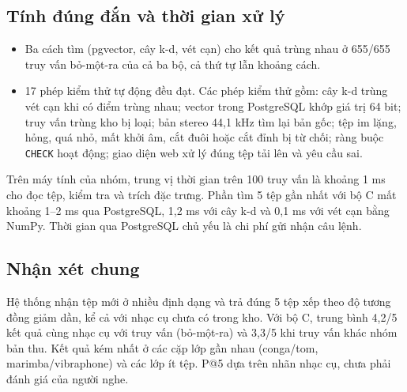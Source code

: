 \documentclass[11pt,a4paper]{article}
\begin{document}
\subsection{Tính đúng đắn và thời gian xử lý}\label{sec:dungdan}
\begin{itemize}
\item Ba cách tìm (pgvector, cây k-d, vét cạn) cho kết quả trùng nhau ở 655/655 truy vấn bỏ-một-ra của cả ba bộ, cả thứ tự lẫn khoảng cách.
\item 17 phép kiểm thử tự động đều đạt. Các phép kiểm thử gồm: cây k-d trùng vét cạn khi có điểm trùng nhau; vector trong PostgreSQL khớp giá trị 64 bit; truy vấn trùng kho bị loại; bản stereo 44,1 kHz tìm lại bản gốc; tệp im lặng, hỏng, quá nhỏ, mất khởi âm, cắt đuôi hoặc cắt đỉnh bị từ chối; ràng buộc \texttt{CHECK} hoạt động; giao diện web xử lý đúng tệp tải lên và yêu cầu sai.
\end{itemize}
Trên máy tính của nhóm, trung vị thời gian trên 100 truy vấn là khoảng 1 ms cho đọc tệp, kiểm tra và trích đặc trưng. Phần tìm 5 tệp gần nhất với bộ C mất khoảng 1--2 ms qua PostgreSQL, 1,2 ms với cây k-d và 0,1 ms với vét cạn bằng NumPy. Thời gian qua PostgreSQL chủ yếu là chi phí gửi nhận câu lệnh.

\subsection{Nhận xét chung}
\enlargethispage{2\baselineskip}
Hệ thống nhận tệp mới ở nhiều định dạng và trả đúng 5 tệp xếp theo độ tương đồng giảm dần, kể cả với nhạc cụ chưa có trong kho. Với bộ C, trung bình 4,2/5 kết quả cùng nhạc cụ với truy vấn (bỏ-một-ra) và 3,3/5 khi truy vấn khác nhóm bản thu. Kết quả kém nhất ở các cặp lớp gần nhau (conga/tom, marimba/vibraphone) và các lớp ít tệp. P@5 dựa trên nhãn nhạc cụ, chưa phải đánh giá của người nghe.
\clearpage
\end{document}
